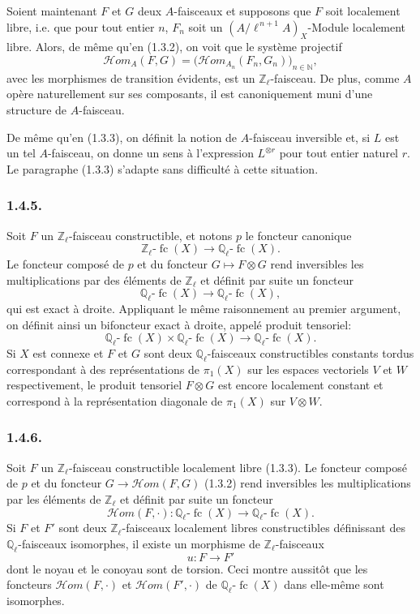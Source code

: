 \documentclass[11pt]{article}
\providecommand{\cHom}{\mathcal{H}om}
\providecommand{\fc}{\operatorname{fc}}
\begin{document}
Soient maintenant \(F\) et \(G\) deux \(A\)-faisceaux et supposons que \(F\) soit localement libre, i.e. que pour tout entier \(n\), \(F_n\) soit un \((A/\ell^{\,n+1}A)_X\)-Module localement libre. Alors, de même qu'en (1.3.2), on
voit que le système projectif
\[
\cHom_A(F,G)=\bigl(\cHom_{A_n}(F_n,G_n)\bigr)_{n\in\mathbb N},
\]
avec les morphismes de transition évidents, est un \(\mathbb Z_\ell\)-faisceau. De plus, comme \(A\) opère naturellement sur ses composants, il est canoniquement muni d'une structure de \(A\)-faisceau.

De même qu'en (1.3.3), on définit la notion de \(A\)-faisceau inversible et, si \(L\) est un tel \(A\)-faisceau, on donne un sens à l'expression \(L^{\otimes r}\) pour tout entier naturel \(r\). Le paragraphe (1.3.3) s'adapte sans difficulté à cette situation.

\subsubsection*{1.4.5.}
Soit \(F\) un \(\mathbb Z_\ell\)-faisceau constructible, et notons \(p\) le foncteur canonique
\[
\mathbb Z_\ell\text{-}\fc(X)\longrightarrow \mathbb Q_\ell\text{-}\fc(X).
\]
Le foncteur composé de \(p\) et du foncteur \(G\mapsto F\otimes G\) rend inversibles les multiplications par des éléments de \(\mathbb Z_\ell\) et définit par suite un foncteur
\[
\mathbb Q_\ell\text{-}\fc(X)\longrightarrow \mathbb Q_\ell\text{-}\fc(X),
\]
qui est exact à droite. Appliquant le même raisonnement au premier argument, on définit ainsi un bifoncteur exact à droite, appelé produit tensoriel:
\[
\mathbb Q_\ell\text{-}\fc(X)\times \mathbb Q_\ell\text{-}\fc(X)
\longrightarrow \mathbb Q_\ell\text{-}\fc(X).
\]
Si \(X\) est connexe et \(F\) et \(G\) sont deux \(\mathbb Q_\ell\)-faisceaux constructibles constants tordus correspondant à des représentations de \(\pi_1(X)\) sur les espaces vectoriels \(V\) et \(W\) respectivement, le produit tensoriel \(F\otimes G\) est encore localement constant et correspond à la représentation diagonale de \(\pi_1(X)\) sur \(V\otimes W\).

\subsubsection*{1.4.6.}
Soit \(F\) un \(\mathbb Z_\ell\)-faisceau constructible localement libre (1.3.3). Le foncteur composé de \(p\) et du foncteur \(G\longrightarrow\cHom(F,G)\) (1.3.2) rend inversibles les multiplications par les éléments de \(\mathbb Z_\ell\) et définit par suite un foncteur
\[
\cHom(F,\cdot):\mathbb Q_\ell\text{-}\fc(X)\longrightarrow \mathbb Q_\ell\text{-}\fc(X).
\]
Si \(F\) et \(F'\) sont deux \(\mathbb Z_\ell\)-faisceaux localement libres constructibles définissant des \(\mathbb Q_\ell\)-faisceaux isomorphes, il existe un morphisme de \(\mathbb Z_\ell\)-faisceaux
\[
u:F\longrightarrow F'
\]
dont le noyau et le conoyau sont de torsion. Ceci montre aussitôt que les foncteurs \(\cHom(F,\cdot)\) et \(\cHom(F',\cdot)\) de \(\mathbb Q_\ell\text{-}\fc(X)\) dans elle-même sont isomorphes.
\end{document}
